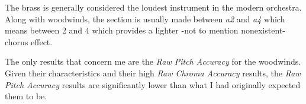 \documentclass{article}
\begin{document}
The brass is generally considered the loudest instrument in the modern orchestra. Along with woodwinds, the section is usually made between \textit{a2} and \textit{a4} which means between 2 and 4 which provides a lighter -not to mention nonexistent- chorus effect.

The only results that concern me are the \textit{Raw Pitch Accuracy} for the woodwinds. Given their characteristics and their high \textit{Raw Chroma Accuracy} results, the \textit{Raw Pitch Accuracy} results are significantly lower than what I had originally expected them to be.



\cite{rachel_bittner_2019_3527750}
\cite{bosch_j_2016_1289786}
\cite{colin_raffel_2014_1416528}
\cite{jordan_lenchitz_2021_5624645}
\cite{international_society_for_music_informat_2021_5776687}
\cite{roger_b_dannenberg_2001_1418263}
\cite{dmitry_bogdanov_2013_1415016}
\cite{j_salamon_2012_1289780}
\end{document}
